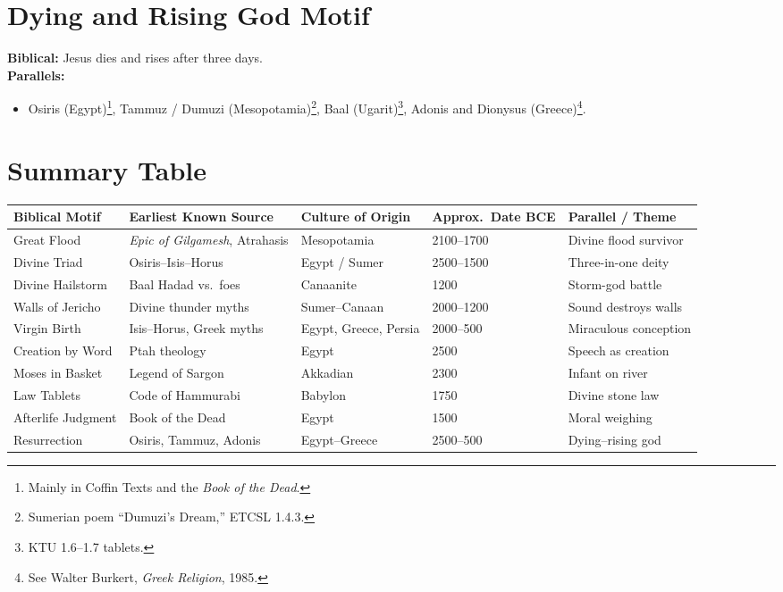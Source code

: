 \documentclass[11pt,a4paper]{article}
\begin{document}
\section{Dying and Rising God Motif}
\textbf{Biblical:} Jesus dies and rises after three days.\\
\textbf{Parallels:}
\begin{itemize}
  \item Osiris (Egypt)\footnote{Mainly in Coffin Texts and the \emph{Book of the Dead}.}, Tammuz / Dumuzi (Mesopotamia)\footnote{Sumerian poem “Dumuzi’s Dream,” ETCSL 1.4.3.}, Baal (Ugarit)\footnote{KTU 1.6–1.7 tablets.}, Adonis and Dionysus (Greece)\footnote{See Walter Burkert, \emph{Greek Religion}, 1985.}.
\end{itemize}

\section{Summary Table}
\renewcommand{\arraystretch}{1.2}
\begin{longtable}{>{\raggedright}p{3.3cm} >{\raggedright}p{3.8cm} >{\raggedright}p{3cm} >{\raggedright}p{2cm} >{\raggedright\arraybackslash}p{4cm}}
\toprule
\textbf{Biblical Motif} & \textbf{Earliest Known Source} & \textbf{Culture of Origin} & \textbf{Approx.\ Date BCE} & \textbf{Parallel / Theme} \\
\midrule
Great Flood & \emph{Epic of Gilgamesh}, Atrahasis & Mesopotamia & 2100–1700 & Divine flood survivor \\
Divine Triad & Osiris–Isis–Horus & Egypt / Sumer & 2500–1500 & Three-in-one deity \\
Divine Hailstorm & Baal Hadad vs.\ foes & Canaanite & 1200 & Storm-god battle \\
Walls of Jericho & Divine thunder myths & Sumer–Canaan & 2000–1200 & Sound destroys walls \\
Virgin Birth & Isis–Horus, Greek myths & Egypt, Greece, Persia & 2000–500 & Miraculous conception \\
Creation by Word & Ptah theology & Egypt & 2500 & Speech as creation \\
Moses in Basket & Legend of Sargon & Akkadian & 2300 & Infant on river \\
Law Tablets & Code of Hammurabi & Babylon & 1750 & Divine stone law \\
Afterlife Judgment & Book of the Dead & Egypt & 1500 & Moral weighing \\
Resurrection & Osiris, Tammuz, Adonis & Egypt–Greece & 2500–500 & Dying–rising god \\
\bottomrule
\end{longtable}
\end{document}
